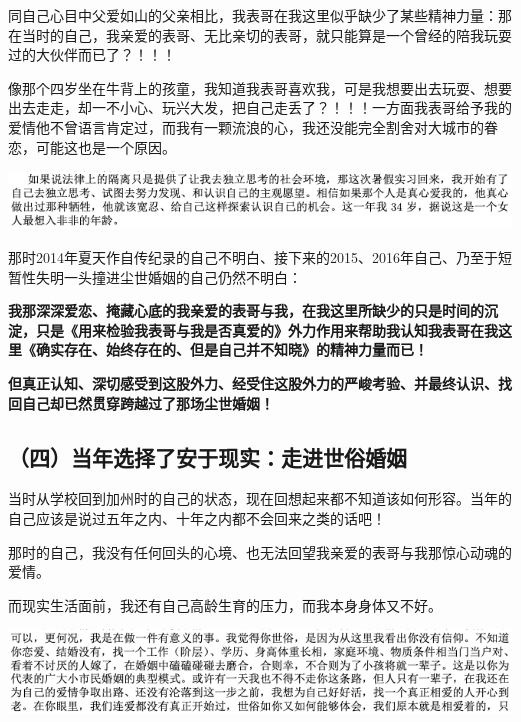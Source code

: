 \documentclass[9pt, b5paper]{article}
\begin{document}
同自己心目中父爱如山的父亲相比，我表哥在我这里似乎缺少了某些精神力量：那在当时的自己，我亲爱的表哥、无比亲切的表哥，就只能算是一个曾经的陪我玩耍过的大伙伴而已了？！！！

像那个四岁坐在牛背上的孩童，我知道我表哥喜欢我，可是我想要出去玩耍、想要出去走走，却一不小心、玩兴大发，把自己走丢了？！！！一方面我表哥给予我的爱情他不曾语言肯定过，而我有一颗流浪的心，我还没能完全割舍对大城市的眷恋，可能这也是一个原因。

\begin{center}
\includegraphics[width=.9\linewidth]{./pic/backups_plans_20210422_075830.png}
\end{center}

那时2014年夏天作自传纪录的自己不明白、接下来的2015、2016年自己、乃至于短暂性失明一头撞进尘世婚姻的自己仍然不明白：

\textbf{我那深深爱恋、掩藏心底的我亲爱的表哥与我，在我这里所缺少的只是时间的沉淀，只是《用来检验我表哥与我是否真爱的》外力作用来帮助我认知我表哥在我这里《确实存在、始终存在的、但是自己并不知晓》的精神力量而已！}

\textbf{但真正认知、深切感受到这股外力、经受住这股外力的严峻考验、并最终认识、找回自己却已然贯穿跨越过了那场尘世婚姻！}

\subsection{（四）当年选择了安于现实：走进世俗婚姻}
\label{sec:org4095c2f}

当时从学校回到加州时的自己的状态，现在回想起来都不知道该如何形容。当年的自己应该是说过五年之内、十年之内都不会回来之类的话吧！

那时的自己，我没有任何回头的心境、也无法回望我亲爱的表哥与我那惊心动魂的爱情。 

而现实生活面前，我还有自己高龄生育的压力，而我本身身体又不好。

\begin{center}
\includegraphics[width=.9\linewidth]{./pic/backups_plans_20210424_095212.png}
\end{center}
\end{document}
